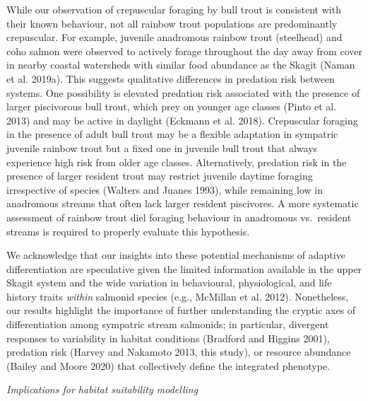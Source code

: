 \documentclass[]{article}
\begin{document}
While our observation of crepuscular foraging by bull trout is
consistent with their known behaviour, not all rainbow trout populations
are predominantly crepuscular. For example, juvenile anadromous rainbow
trout (steelhead) and coho salmon were observed to actively forage
throughout the day away from cover in nearby coastal watersheds with
similar food abundance as the Skagit (Naman et al. 2019a). This suggests
qualitative differences in predation risk between systems. One
possibility is elevated predation risk associated with the presence of
larger piscivorous bull trout, which prey on younger age classes (Pinto
et al. 2013) and may be active in daylight (Eckmann et al. 2018).
Crepuscular foraging in the presence of adult bull trout may be a
flexible adaptation in sympatric juvenile rainbow trout but a fixed one
in juvenile bull trout that always experience high risk from older age
classes. Alternatively, predation risk in the presence of larger
resident trout may restrict juvenile daytime foraging irrespective of
species (Walters and Juanes 1993), while remaining low in anadromous
streams that often lack larger resident piscivores. A more systematic
assessment of rainbow trout diel foraging behaviour in anadromous
vs.~resident streams is required to properly evaluate this hypothesis.

We acknowledge that our insights into these potential mechanisms of
adaptive differentiation are speculative given the limited information
available in the upper Skagit system and the wide variation in
behavioural, physiological, and life history traits \emph{within}
salmonid species (e.g., McMillan et al. 2012). Nonetheless, our results
highlight the importance of further understanding the cryptic axes of
differentiation among sympatric stream salmonids; in particular,
divergent responses to variability in habitat conditions (Bradford and
Higgins 2001), predation risk (Harvey and Nakamoto 2013, this study), or
resource abundance (Bailey and Moore 2020) that collectively define the
integrated phenotype.

\emph{Implications for habitat suitability modelling}
\end{document}
